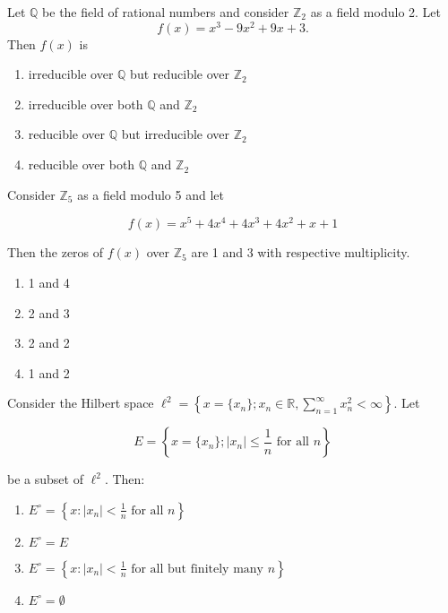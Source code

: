 \item Let $\mathbb{Q}$ be the field of rational numbers and consider $\mathbb{Z}_2$ as a field modulo 2. Let 
\begin{equation*}
f(x) = x^3 - 9x^2 + 9x + 3.
\end{equation*}
Then $f(x)$ is
\begin{enumerate}
    \item irreducible over $\mathbb{Q}$ but reducible over $\mathbb{Z}_2$
    \item irreducible over both $\mathbb{Q}$ and $\mathbb{Z}_2$
    \item reducible over $\mathbb{Q}$ but irreducible over $\mathbb{Z}_2$
    \item reducible over both $\mathbb{Q}$ and $\mathbb{Z}_2$
\end{enumerate}
\item Consider $\mathbb{Z}_5$ as a field modulo 5 and let

\begin{equation*}
f(x) = x^5 + 4x^4 + 4x^3 + 4x^2 + x + 1
\end{equation*}

Then the zeros of $f(x)$ over $\mathbb{Z}_5$ are 1 and 3 with respective multiplicity.

\begin{enumerate}
    \item 1 and 4
    \item 2 and 3
    \item 2 and 2
    \item 1 and 2
\end{enumerate}

\item Consider the Hilbert space $\ell^2 = \left\{ x = \{x_n\}; x_n \in \mathbb{R}, \sum_{n=1}^{\infty} x_n^2 < \infty \right\}$. Let

\begin{equation*}
E = \left\{ x = \{x_n\}; |x_n| \leq \frac{1}{n} \text{ for all } n \right\}
\end{equation*}

be a subset of $\ell^2$. Then:

\begin{enumerate}
    \item $E^\circ = \left\{ x : |x_n| < \frac{1}{n} \text{ for all } n \right\}$
    \item $E^\circ = E$
    \item $E^\circ = \left\{ x : |x_n| < \frac{1}{n} \text{ for all but finitely many } n \right\}$
    \item $E^\circ = \emptyset$
\end{enumerate}

